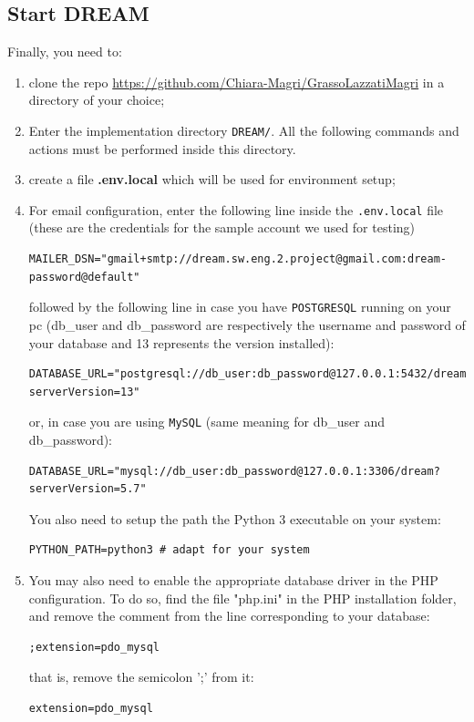 \documentclass{article}
\begin{document}
\subsection{Start DREAM}
Finally, you need to:
\begin{enumerate}
    \item clone the repo \url{https://github.com/Chiara-Magri/GrassoLazzatiMagri} in a directory of your choice;
\item Enter the implementation directory \verb|DREAM/|. All the following commands and actions must be performed inside this directory.
\item create a file \textbf{.env.local} which will be used for environment setup;
\item For email configuration, enter the following line inside the \verb|.env.local| file (these are the credentials for the sample account we used for testing)
\begin{verbatim}
MAILER_DSN="gmail+smtp://dream.sw.eng.2.project@gmail.com:dream-password@default"
\end{verbatim}
followed by the following line in case you have \verb|POSTGRESQL| running on your pc (db\_user and db\_password are respectively the username and password of your database and 13 represents the version installed):
\begin{verbatim}
DATABASE_URL="postgresql://db_user:db_password@127.0.0.1:5432/dream?serverVersion=13"
\end{verbatim}
or, in case you are using \verb|MySQL| (same meaning for db\_user and db\_password):
\begin{verbatim}
DATABASE_URL="mysql://db_user:db_password@127.0.0.1:3306/dream?serverVersion=5.7"
\end{verbatim}
You also need to setup the path the Python 3 executable on your system:
\begin{verbatim}
PYTHON_PATH=python3 # adapt for your system
\end{verbatim}
\item You may also need to enable the appropriate database driver in the PHP configuration. To do so, find the file "php.ini" in the PHP installation folder, and remove the comment from the line corresponding to your database:
\begin{verbatim}
;extension=pdo_mysql
\end{verbatim}
that is, remove the semicolon ';' from it:
\begin{verbatim}
extension=pdo_mysql
\end{verbatim}

\end{enumerate}
\end{document}
